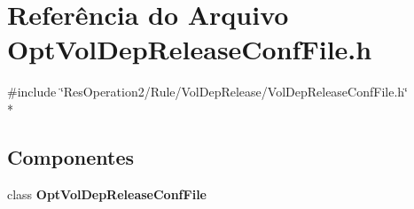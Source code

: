 \section{Referência do Arquivo Opt\+Vol\+Dep\+Release\+Conf\+File.\+h}
\label{_opt_vol_dep_release_conf_file_8h}
{\ttfamily \#include \char`\"{}Res\+Operation2/\+Rule/\+Vol\+Dep\+Release/\+Vol\+Dep\+Release\+Conf\+File.\+h\char`\"{}}\\*
\subsection*{Componentes}
\begin{DoxyCompactItemize}
\item 
class {\bf Opt\+Vol\+Dep\+Release\+Conf\+File}
\end{DoxyCompactItemize}
